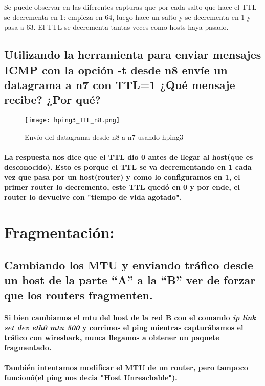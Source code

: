 \documentclass[11pt]{article} %
\begin{document}
        Se puede observar en las diferentes capturas que por cada salto que hace el TTL se decrementa en 1: empieza en 64, luego hace un salto y se decrementa en 1 y pasa a 63. El TTL se decrementa tantas veces como hosts haya pasado.


        \subsection{Utilizando la herramienta para enviar mensajes ICMP con la opción -t desde n8 envíe un datagrama a n7 con TTL=1 ¿Qué mensaje recibe? ¿Por qué?}

        \begin{figure}[H]
            \centering
            \texttt{[image: hping3\_TTL\_n8.png]}
            \caption{Envío del datagrama desde n8 a n7 usando hping3}
            \label{fig:hping3_TTL_n8}
        \end{figure}

        \paragraph{La respuesta nos dice que el TTL dio 0 antes de llegar al host(que es desconocido). Esto es porque el TTL se va decrementando en 1 cada vez que pasa por un host(router) y como lo configuramos en 1, el primer router lo decremento, este TTL quedó en 0 y por ende, el router lo devuelve con "tiempo de vida agotado".}

    \section{Fragmentación:}
        \subsection{Cambiando los MTU y enviando tráfico desde un host de la parte “A” a la “B” ver de forzar que los routers fragmenten.}

        \paragraph{Si bien cambiamos el mtu del host de la red B con el comando \textit{ip link set dev eth0 mtu 500} y corrimos el ping mientras capturábamos el tráfico con wireshark, nunca llegamos a obtener un paquete fragmentado.} 
        \paragraph{También intentamos modificar el MTU de un router, pero tampoco funcionó(el ping nos decia "Host Unreachable").}
\end{document}
